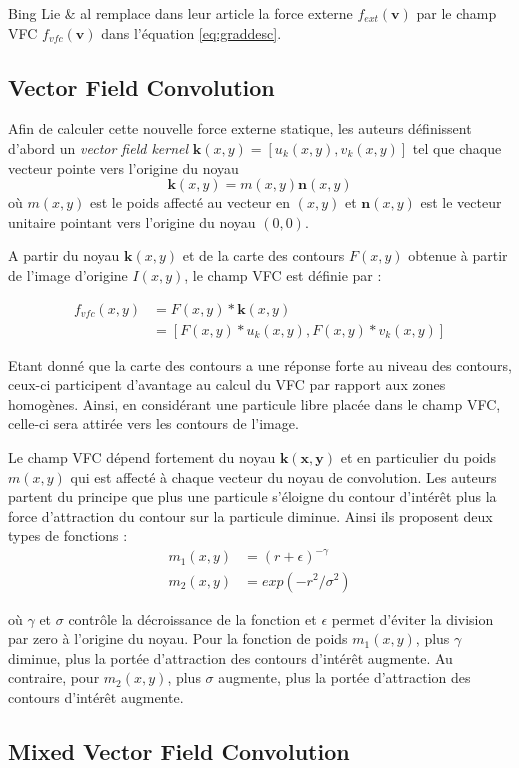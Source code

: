 \documentclass{article}
\begin{document}
Bing Lie \& al remplace dans leur article la force externe $f_{ext}(\mathbf{v})$ par le champ VFC $f_{vfc}(\mathbf{v})$ dans l'équation \ref{eq:graddesc}.

\subsection{Vector Field Convolution}

Afin de calculer cette nouvelle force externe statique, les auteurs définissent d'abord un \textit{vector field kernel} $\mathbf{k}(x,y)=[u_k(x,y),v_k(x,y)]$ tel que chaque vecteur pointe vers l'origine du noyau 
\begin{equation}
	\mathbf{k}(x,y)=m(x,y)\mathbf{n}(x,y)
\end{equation}
où $m(x,y)$ est le poids affecté au vecteur en $(x,y)$ et $\mathbf{n}(x,y)$ est le vecteur unitaire pointant vers l'origine du noyau $(0,0)$.

A partir du noyau $\mathbf{k}(x,y)$ et de la carte des contours $F(x,y)$ obtenue à partir de l'image d'origine $I(x,y)$, le champ VFC est définie par :

\begin{align*}
	f_{vfc}(x,y) & = F(x,y)*\mathbf{k}(x,y) \\
				 & = [F(x,y)*u_k(x,y),F(x,y)*v_k(x,y)]
\end{align*}

Etant donné que la carte des contours a une réponse forte au niveau des contours, ceux-ci participent d'avantage au calcul du VFC par rapport aux zones homogènes. Ainsi, en considérant une particule libre placée dans le champ VFC, celle-ci sera attirée vers les contours de l'image. 

Le champ VFC dépend fortement du noyau $\mathbf{k(x,y)}$ et en particulier du poids $m(x,y)$ qui est affecté à chaque vecteur du noyau de convolution. Les auteurs partent du principe que plus une particule s'éloigne du contour d'intérêt plus la force d'attraction du contour sur la particule diminue. Ainsi ils proposent deux types de fonctions :
\begin{align}
	m_1(x,y) & = (r+\epsilon)^{-\gamma} \\
	m_2(x,y) & = exp(-r^2/\sigma^2)
\end{align}

où $\gamma$ et $\sigma$ contrôle la décroissance de la fonction et $\epsilon$ permet d'éviter la division par zero à l'origine du noyau. Pour la fonction de poids $m_1(x,y)$, plus $\gamma$ diminue, plus la portée d'attraction des contours d'intérêt augmente. Au contraire, pour $m_2(x,y)$, plus $\sigma$ augmente, plus la portée d'attraction des contours d'intérêt augmente. 


\subsection{Mixed Vector Field Convolution}



\subsection{}
\end{document}
